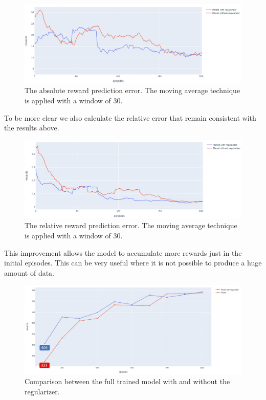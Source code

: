 \begin{figure}[H]
\centering
\includegraphics[width=1. \textwidth, height=.25\textheight]{pictures/plot_ass_diff}
\caption{ The absolute reward prediction error. The moving average technique is applied with a window of 30. }
\end{figure}

To be more clear we also calculate the relative error that remain consistent with the results above.

\begin{figure}[H]
\centering
\includegraphics[width=1. \textwidth, height=.25\textheight]{pictures/plot_rel_diff}
\caption{ The relative reward prediction error. The moving average technique is applied with a window of 30. }
\end{figure}

This improvement allows the model to accumulate more rewards just in the initial episodes. This can be very useful where it is not possible to produce a huge amount of data.
\begin{figure}[H]
\centering
\includegraphics[width=1. \textwidth, height=.25\textheight]{pictures/full_reg_vs_original}
\caption{ Comparison between the full trained model with and without the regularizer.  }
\end{figure}

